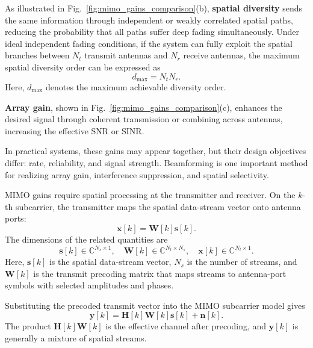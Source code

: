 As illustrated in Fig.~\ref{fig:mimo_gains_comparison}(b),
\textbf{spatial diversity} sends the same information through independent or
weakly correlated spatial paths, reducing the probability that all paths suffer
deep fading simultaneously.
Under ideal independent fading conditions,
if the system can fully exploit the spatial branches between \(N_t\) transmit antennas and \(N_r\) receive antennas,
the maximum spatial diversity order can be expressed as
\begin{equation}
d_{\max}
=
N_tN_r.
\label{eq:mimo_max_diversity_order}
\end{equation}
Here, \(d_{\max}\) denotes the maximum achievable diversity order.

\textbf{Array gain}, shown in Fig.~\ref{fig:mimo_gains_comparison}(c),
enhances the desired signal through coherent transmission or combining across
antennas, increasing the effective SNR or SINR.

In practical systems, these gains may appear together, but their design
objectives differ: rate, reliability, and signal strength.
Beamforming is one important method for realizing array gain, interference
suppression, and spatial selectivity.

MIMO gains require spatial processing at the transmitter and receiver.
On the \(k\)-th subcarrier, the transmitter maps the spatial data-stream vector
onto antenna ports:
\begin{equation}
\mathbf{x}[k]
=
\mathbf{W}[k]\mathbf{s}[k].
\label{eq:mimo_precoding}
\end{equation}
The dimensions of the related quantities are
\[
\mathbf{s}[k]\in\mathbb{C}^{N_s\times 1},
\quad
\mathbf{W}[k]\in\mathbb{C}^{N_t\times N_s},
\quad
\mathbf{x}[k]\in\mathbb{C}^{N_t\times 1}.
\]
Here, \(\mathbf{s}[k]\) is the spatial data-stream vector, \(N_s\) is the
number of streams, and \(\mathbf{W}[k]\) is the transmit precoding matrix that
maps streams to antenna-port symbols with selected amplitudes and phases.

Substituting the precoded transmit vector into the MIMO subcarrier model gives
\begin{equation}
\mathbf{y}[k]
=
\mathbf{H}[k]\mathbf{W}[k]\mathbf{s}[k]
+
\mathbf{n}[k].
\label{eq:mimo_precoded_channel}
\end{equation}
The product \(\mathbf{H}[k]\mathbf{W}[k]\) is the effective channel after
precoding, and \(\mathbf{y}[k]\) is generally a mixture of spatial streams.

